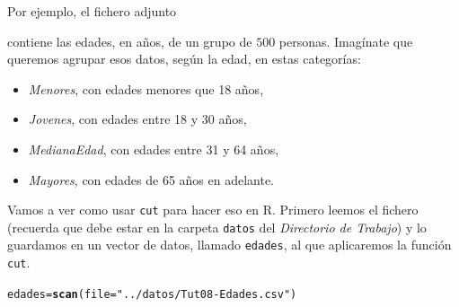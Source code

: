 \documentclass[10pt,a4paper]{article}\usepackage[]{graphicx}\usepackage[]{color}
\makeatletter
\newcommand{\hlstr}[1]{\textcolor[rgb]{0.192,0.494,0.8}{#1}}%
\newcommand{\hlstd}[1]{\textcolor[rgb]{0.345,0.345,0.345}{#1}}%
\newcommand{\hlkwb}[1]{\textcolor[rgb]{0.69,0.353,0.396}{#1}}%
\newcommand{\hlkwc}[1]{\textcolor[rgb]{0.333,0.667,0.333}{#1}}%
\newcommand{\hlkwd}[1]{\textcolor[rgb]{0.737,0.353,0.396}{\textbf{#1}}}%
\newenvironment{kframe}{%
 \def\at@end@of@kframe{}%
 \ifinner\ifhmode%
  \def\at@end@of@kframe{\end{minipage}}%
  \begin{minipage}{\columnwidth}%
 \fi\fi%
 \def\FrameCommand##1{\hskip\@totalleftmargin \hskip-\fboxsep
 \colorbox{shadecolor}{##1}\hskip-\fboxsep
     \hskip-\linewidth \hskip-\@totalleftmargin \hskip\columnwidth}%
 \MakeFramed {\advance\hsize-\width
   \@totalleftmargin\z@ \linewidth\hsize
   \@setminipage}}%
 {\par\unskip\endMakeFramed%
 \at@end@of@kframe}
\newenvironment{knitrout}{}{} %
\newcounter {cont01}
\makeatother
\begin{document}
Por ejemplo, el fichero adjunto
\begin{center}
\end{center}
contiene las edades, en años, de un grupo de $500$ personas. Imagínate que queremos agrupar esos datos, según la edad, en estas categorías:

\begin{itemize}
  \item {\em Menores}, con edades menores que 18 años,
  \item {\em Jovenes}, con edades entre 18 y 30 años,
  \item {\em MedianaEdad}, con edades entre 31 y 64 años,
  \item {\em Mayores}, con edades de 65 años en adelante.
\end{itemize}
Vamos a ver como usar {\tt cut} para hacer eso en R. Primero leemos el fichero (recuerda que debe estar en la carpeta {\tt datos} del {\em Directorio de Trabajo}) y lo guardamos en un vector de datos, llamado {\tt edades}, al que aplicaremos la función {\tt cut}.

\begin{knitrout}
\color{fgcolor}\begin{kframe}
\begin{alltt}
\hlstd{edades} \hlkwb{=} \hlkwd{scan}\hlstd{(}\hlkwc{file}\hlstd{=}\hlstr{"../datos/Tut08-Edades.csv"}\hlstd{)}
\end{alltt}
\end{kframe}
\end{knitrout}
\end{document}
